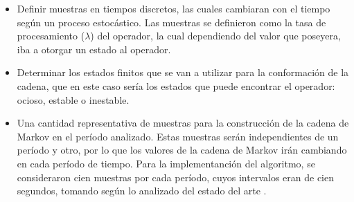 \begin{itemize}
	\item Definir muestras en tiempos discretos, las cuales cambiaran con el tiempo según un proceso estocástico. Las muestras se definieron como la tasa de procesamiento ($\lambda$) del operador, la cual dependiendo del valor que poseyera, iba a otorgar un estado al operador.
	\item Determinar los estados finitos que se van a utilizar para la conformación de la cadena, que en este caso sería los estados que puede encontrar el operador: ocioso, estable o inestable.
	\item Una cantidad representativa de muestras para la construcción de la cadena de Markov en el período analizado. Estas muestras serán independientes de un período y otro, por lo que los valores de la cadena de Markov irán cambiando en cada período de tiempo. Para la implementanción del algoritmo, se consideraron cien muestras por cada período, cuyos intervalos eran de cien segundos, tomando según lo analizado del estado del arte \citep{GongGW10}.
\end{itemize}



